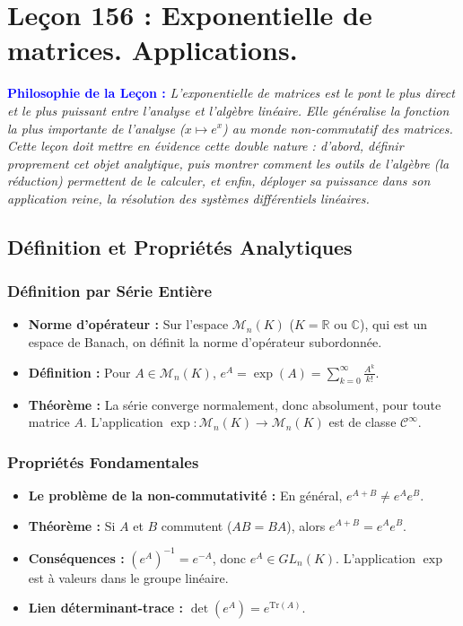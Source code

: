 \documentclass[12pt, a4paper, parskip=full]{report}
\theoremstyle{agregstyle}
\newenvironment{philosophie}
  {\par\medskip\noindent\begin{oframed}\noindent\textbf{\textcolor{blue}{Philosophie de la Leçon :}}\itshape}
  {\end{oframed}\par\medskip}
\begin{document}
\chapter{Leçon 156 : Exponentielle de matrices. Applications.}

\begin{philosophie}
    L'exponentielle de matrices est le pont le plus direct et le plus puissant entre l'analyse et l'algèbre linéaire. Elle généralise la fonction la plus importante de l'analyse ($x \mapsto e^x$) au monde non-commutatif des matrices. Cette leçon doit mettre en évidence cette double nature : d'abord, définir proprement cet objet analytique, puis montrer comment les outils de l'algèbre (la réduction) permettent de le calculer, et enfin, déployer sa puissance dans son application reine, la résolution des systèmes différentiels linéaires.
\end{philosophie}

\section{Définition et Propriétés Analytiques}
\subsection{Définition par Série Entière}
\begin{itemize}
    \item \textbf{Norme d'opérateur :} Sur l'espace $\mathcal{M}_n(K)$ ($K=\mathbb{R}$ ou $\mathbb{C}$), qui est un espace de Banach, on définit la norme d'opérateur subordonnée.
    \item \textbf{Définition :} Pour $A \in \mathcal{M}_n(K)$, $e^A = \exp(A) = \sum_{k=0}^\infty \frac{A^k}{k!}$.
    \item \textbf{Théorème :} La série converge normalement, donc absolument, pour toute matrice $A$. L'application $\exp: \mathcal{M}_n(K) \to \mathcal{M}_n(K)$ est de classe $\mathcal{C}^\infty$.
\end{itemize}
\subsection{Propriétés Fondamentales}
\begin{itemize}
    \item \textbf{Le problème de la non-commutativité :} En général, $e^{A+B} \neq e^A e^B$.
    \item \textbf{Théorème :} Si $A$ et $B$ commutent ($AB=BA$), alors $e^{A+B} = e^A e^B$.
    \item \textbf{Conséquences :} $(e^A)^{-1} = e^{-A}$, donc $e^A \in GL_n(K)$. L'application $\exp$ est à valeurs dans le groupe linéaire.
    \item \textbf{Lien déterminant-trace :} $\det(e^A) = e^{\mathrm{Tr}(A)}$.
\end{itemize}
\end{document}
